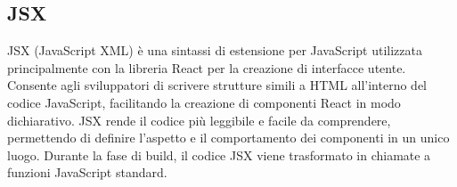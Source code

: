 \vspace{2em}
\subsection*{JSX}
JSX (JavaScript XML) è una sintassi di estensione per JavaScript utilizzata principalmente con la libreria React per la creazione di interfacce utente. Consente agli sviluppatori di scrivere strutture simili a HTML all'interno del codice JavaScript, facilitando la creazione di componenti React in modo dichiarativo. JSX rende il codice più leggibile e facile da comprendere, permettendo di definire l'aspetto e il comportamento dei componenti in un unico luogo. Durante la fase di build, il codice JSX viene trasformato in chiamate a funzioni JavaScript standard.
